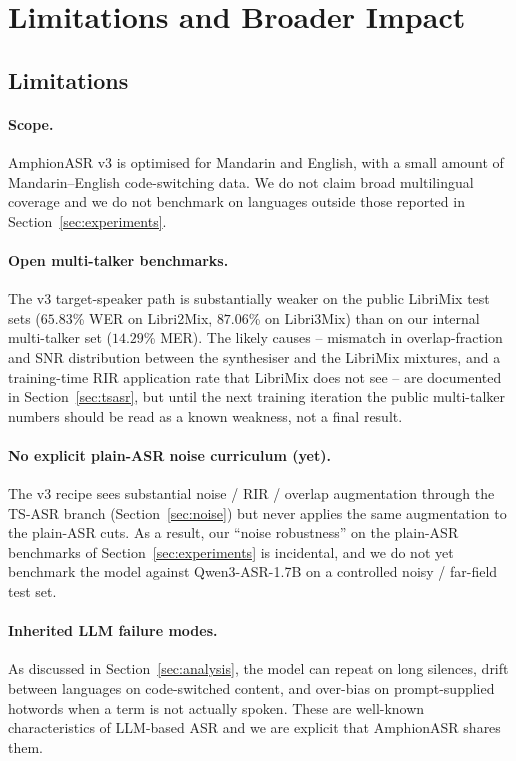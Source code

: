 \section{Limitations and Broader Impact}
\label{sec:limitations}

\subsection{Limitations}

\paragraph{Scope.}
AmphionASR v3 is optimised for Mandarin and English, with a small
amount of Mandarin--English code-switching data. We do not claim broad
multilingual coverage and we do not benchmark on languages outside
those reported in Section~\ref{sec:experiments}.

\paragraph{Open multi-talker benchmarks.}
The v3 target-speaker path is substantially weaker on the public
LibriMix test sets ($65.83$\% WER on Libri2Mix, $87.06$\% on Libri3Mix)
than on our internal multi-talker set ($14.29$\% MER). The likely
causes -- mismatch in overlap-fraction and SNR distribution between
the synthesiser and the LibriMix mixtures, and a training-time RIR
application rate that LibriMix does not see -- are documented in
Section~\ref{sec:tsasr}, but until the next training iteration the
public multi-talker numbers should be read as a known weakness, not a
final result.

\paragraph{No explicit plain-ASR noise curriculum (yet).}
The v3 recipe sees substantial noise / RIR / overlap augmentation
through the TS-ASR branch (Section~\ref{sec:noise}) but never applies
the same augmentation to the plain-ASR cuts. As a result, our
``noise robustness'' on the plain-ASR benchmarks of
Section~\ref{sec:experiments} is incidental, and we do not yet
benchmark the model against Qwen3-ASR-1.7B \cite{qwen2025qwen3asr} on
a controlled noisy / far-field test set.

\paragraph{Inherited LLM failure modes.}
As discussed in Section~\ref{sec:analysis}, the model can repeat on
long silences, drift between languages on code-switched content, and
over-bias on prompt-supplied hotwords when a term is not actually
spoken. These are well-known characteristics of LLM-based ASR and we
are explicit that AmphionASR shares them.

